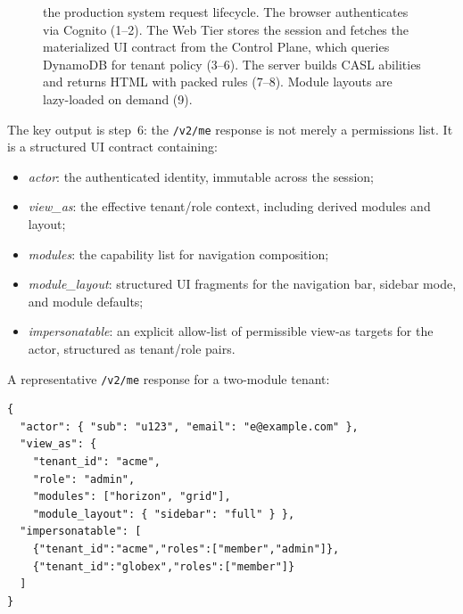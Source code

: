 \documentclass[10pt,journal]{IEEEtran}
\newcommand{\system}{the production system}
\newcommand{\viewas}{view-as}
\newcommand{\code}[1]{{\small\textcolor{CausifyBlue}{\texttt{#1}}}}
\begin{document}
\begin{figure}[!t]
{%
  }
  \caption{\system{} request lifecycle. The browser authenticates via
  Cognito (1--2). The Web Tier stores the session and fetches the
  materialized UI contract from the Control Plane, which queries DynamoDB
  for tenant policy (3--6). The server builds CASL abilities and returns
  HTML with packed rules (7--8). Module layouts are lazy-loaded on demand
  (9).}
  \label{fig:architecture}
\end{figure}

The key output is step~6: the \code{/v2/me} response is not merely a
permissions list. It is a structured UI contract containing:
\begin{itemize}
  \item[\textbullet] \textit{actor}: the authenticated identity, immutable across
    the session;
  \item[\textbullet] \textit{view\_as}: the effective tenant/role context, including
    derived modules and layout;
  \item[\textbullet] \textit{modules}: the capability list for navigation composition;
  \item[\textbullet] \textit{module\_layout}: structured UI fragments for the
    navigation bar, sidebar mode, and module defaults;
  \item[\textbullet] \textit{impersonatable}: an explicit allow-list of permissible
    \viewas{} targets for the actor, structured as tenant/role pairs.
\end{itemize}

\noindent A representative \code{/v2/me} response for a two-module tenant:
\noindent\begin{minipage}{\columnwidth}
\begin{lstlisting}
{
  "actor": { "sub": "u123", "email": "e@example.com" },
  "view_as": {
    "tenant_id": "acme",
    "role": "admin",
    "modules": ["horizon", "grid"],
    "module_layout": { "sidebar": "full" } },
  "impersonatable": [
    {"tenant_id":"acme","roles":["member","admin"]},
    {"tenant_id":"globex","roles":["member"]}
  ]
}
\end{lstlisting}
\end{minipage}
\end{document}
